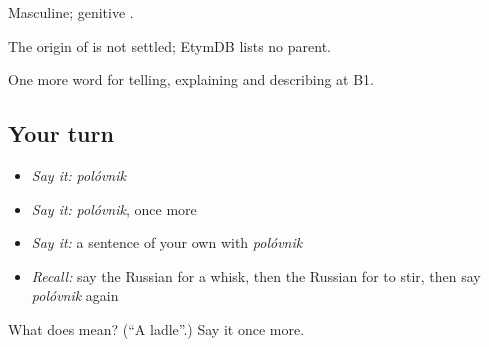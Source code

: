 Masculine; genitive \emph{}.

\begin{cousinweb}
The origin of \emph{} is not settled; EtymDB lists no parent.
\end{cousinweb}

\begin{grammarlens}[title={What you've built}]
One more word for telling, explaining and describing at B1.
\end{grammarlens}

\subsection*{Your turn}
\begin{itemize}
\raggedright
  \item \emph{Say it:} \emph{polóvnik}
  \item \emph{Say it:} \emph{polóvnik}, once more
  \item \emph{Say it:} a sentence of your own with \emph{polóvnik}
  \item \emph{Recall:} say the Russian for a whisk, then the Russian for to stir, then say \emph{polóvnik} again
\end{itemize}

\begin{tcolorbox}[breakable,colback=teal!4,colframe=teal!35!black,title={Before you move on}]
What does  mean? (\textquotedblleft{}A ladle\textquotedblright{}.) Say it once more.
\end{tcolorbox}
